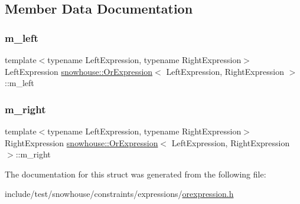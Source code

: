 \subsection{Member Data Documentation}
\mbox{\label{structsnowhouse_1_1OrExpression_a467eee87a951c2d86ec852e12e46eb96}} 
\subsubsection{\texorpdfstring{m\_left}{m\_left}}
{\footnotesize\ttfamily template$<$typename Left\+Expression, typename Right\+Expression$>$ \\
Left\+Expression \mbox{\hyperlink{structsnowhouse_1_1OrExpression}{snowhouse\+::\+Or\+Expression}}$<$ Left\+Expression, Right\+Expression $>$\+::m\+\_\+left}

\mbox{\label{structsnowhouse_1_1OrExpression_a7919c7808213c4ab6c5f09672fee2d87}} 
\subsubsection{\texorpdfstring{m\_right}{m\_right}}
{\footnotesize\ttfamily template$<$typename Left\+Expression, typename Right\+Expression$>$ \\
Right\+Expression \mbox{\hyperlink{structsnowhouse_1_1OrExpression}{snowhouse\+::\+Or\+Expression}}$<$ Left\+Expression, Right\+Expression $>$\+::m\+\_\+right}



The documentation for this struct was generated from the following file\+:\begin{DoxyCompactItemize}
\item 
include/test/snowhouse/constraints/expressions/\mbox{\hyperlink{orexpression_8h}{orexpression.\+h}}\end{DoxyCompactItemize}
